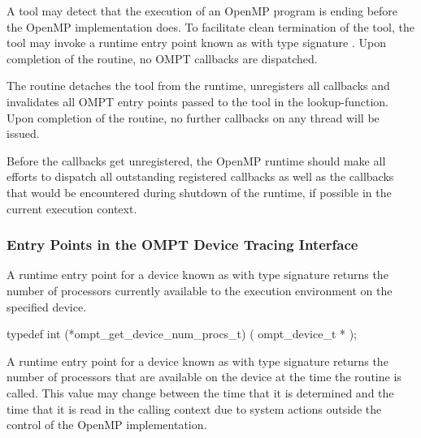 \descr

A tool may detect that the execution of an OpenMP program is ending 
before the OpenMP implementation does.
To facilitate clean termination of the tool, the tool may
invoke a runtime entry point known as 
with type signature . 
Upon completion of the  routine, no OMPT callbacks are 
dispatched.

\effect

The  routine detaches the tool from the runtime, unregisters 
all callbacks and invalidates all OMPT entry points passed to the tool in the 
lookup-function. 
Upon completion of the  routine, no further callbacks on any 
thread will be issued.

Before the callbacks get unregistered, the OpenMP runtime should make all efforts to 
dispatch all outstanding registered callbacks as well as the callbacks that would be 
encountered during shutdown of the runtime, if possible in the current execution context.

\subsubsection{Entry Points in the OMPT Device Tracing Interface}
\label{sec:ompt-tracing-entry-points}


\label{sec:ompt_get_device_num_procs_t}

\summary

A runtime entry point for a device known as
 with type signature
 returns
the number of processors currently available to the execution
environment on the specified device.

\format
\begin{ccppspecific}
\begin{omptInquiry}
typedef int (*ompt_get_device_num_procs_t) (
  ompt_device_t *
);
\end{omptInquiry}
\end{ccppspecific}

\descr
A runtime entry point for a device known
as  with type signature
 returns the
number of processors that are available on the device at the time
the routine is called. This value may change between the time that
it is determined and the time that it is read in the calling context due to
system actions outside the control of the OpenMP implementation.

